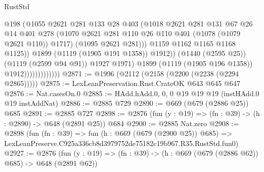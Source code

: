 \begin{lexlean}{RustStd}
\begin{coremodule}
                                        @198
                                        (@1055
                                          @2621
                                          @281
                                          @133
                                          @28
                                          @403
                                          (@1018
                                            @2621
                                            @281
                                            @131
                                            @67
                                            @26
                                            @14
                                            @401
                                            @278
                                            (@1070
                                              @2621
                                              @281
                                              @110
                                              @26
                                              @110
                                              @401
                                              (@1078 (@1079 @2621 @110))
                                              @1717)
                                            (@1095 @2621 @281)))
                                        @1159
                                        @1162
                                        @1165
                                        @1168
                                        @1125))
                                    @1899
                                    (@1119 (@1905 @191 @1358))
                                    @1912))
                                (@1440 (@2595 @25))
                                (@1119 (@2599 @94 @91))
                                @1927
                                @1971)
                              @1899
                              (@1119 (@1905 @196 @1358))
                              @1912)))))))))))))
@2871 := @1996 (@2112 (@2158 (@2200 (@2238 (@2294 @2865)))))
@2875 := LexLeanPreservation.Rust.CrateOK @643 @645 @647
@2876 := Nat.casesOn.{0}
@2885 := HAdd.hAdd.{0, 0, 0} @19 @19 @19 (instHAdd.{0} @19 instAddNat)
@2886 := @2885 @729
@2890 := @669 (@679 (@2886 @25)) @685
@2891 := @2885 @727
@2898 := @2876 (fun (y : @19) => (fn : @39) -> (h : @2890) -> @648 (@2891 @25)) @684
@2900 := @2885 Nat.zero
@2908 := @2898
    (fun (fn : @39) =>
    fun (h : @669 (@679 (@2900 @25)) @685) =>
    LexLeanPreserve.C925a336cb8d3979752de75182c19b967.R35.RustStd.fun0)
@2927 := @2876
    (fun (y : @19) => (fn : @39) -> (h : @669 (@679 (@2886 @62)) @685) -> @648 (@2891 @62))

\end{coremodule}
\end{lexlean}
